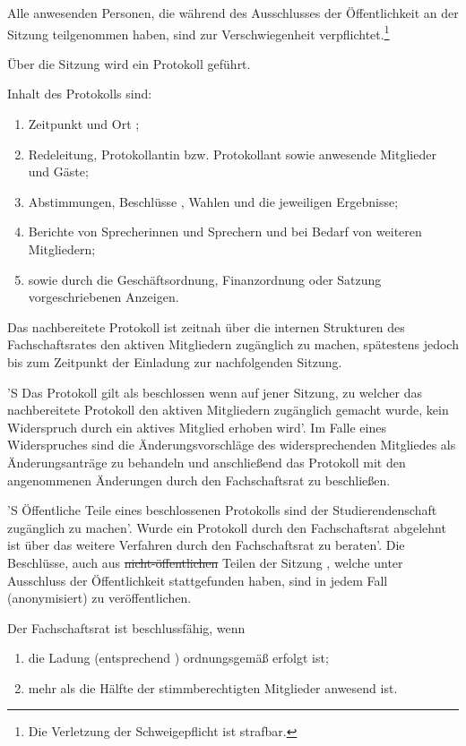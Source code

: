 \documentclass[%
	parskip=half,
]{scrartcl}
\newcommand{\edit}[1]{{\color{red} #1}}
\newcommand{\add}[1]{{\color{blue} #1}}
\newcommand{\new}[1]{{\color{orange} #1}}
\newcommand{\delete}[1]{{\color{red} \sout{#1}}}
\begin{document}
\begin{contract}
\edit{Alle anwesenden Personen, die während des Ausschlusses der Öffentlichkeit an der Sitzung teilgenommen haben, sind 
zur Verschwiegenheit verpflichtet.}\footnote{\add{Die Verletzung der Schweigepflicht ist strafbar.}}


Über die Sitzung wird ein Protokoll geführt.

Inhalt des Protokolls sind:
\begin{enumerate}[\qquad a)]
	\item \add{Zeitpunkt und} Ort\edit{;}
	\item \edit{Rede}leitung, \edit{Protokollantin bzw. Protokollant} sowie anwesende Mitglieder und Gäste;
	\item Abstimmungen, Beschlüsse\add{, Wahlen} und die jeweiligen Ergebnisse;
	\item Berichte von \edit{Sprecherinnen und Sprechern} \add{und bei Bedarf von weiteren Mitgliedern};
	\item sowie durch die Geschäftsordnung, Finanzordnung oder Satzung vorgeschriebenen Anzeigen.
\end{enumerate}

Das nachbereitete Protokoll ist zeitnah über die internen Strukturen des Fachschaftsrates den \new{aktiven} Mitgliedern
zugänglich zu machen, spätestens jedoch bis zum Zeitpunkt der Einladung zur nachfolgenden Sitzung.

'S Das Protokoll gilt als beschlossen wenn auf jener Sitzung, zu welcher das nachbereitete Protokoll den \new{aktiven}
Mitgliedern zugänglich gemacht wurde, kein Widerspruch durch ein \new{aktives} Mitglied erhoben wird'. Im Falle eines
Widerspruches sind die Änderungsvorschläge des widersprechenden Mitgliedes als Änderungsanträge zu behandeln und
anschließend das Protokoll mit den angenommenen Änderungen durch den Fachschaftsrat zu beschließen.

'S Öffentliche Teile eines beschlossenen Protokolls sind der Studierendenschaft zugänglich zu machen'. Wurde ein 
Protokoll durch den Fachschaftsrat abgelehnt ist über das weitere Verfahren durch den Fachschaftsrat zu beraten'. Die 
Beschlüsse, auch aus \delete{nicht-öffentlichen} Teilen der Sitzung\add{, welche unter Ausschluss der Öffentlichkeit 
stattgefunden haben}, sind in jedem Fall (anonymisiert) zu veröffentlichen.


Der Fachschaftsrat ist beschlussfähig, wenn
\begin{enumerate}[\qquad a)]
	\item die Ladung \add{(entsprechend )} ordnungsgemäß erfolgt ist;
	\item mehr als die Hälfte der stimmberechtigten Mitglieder anwesend ist.
\end{enumerate}


\end{contract}
\end{document}
